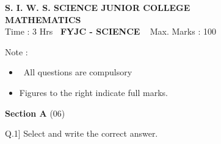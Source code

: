 \documentclass[16pt,a4paper]{article}
\begin{document}
\begin{center}
\textbf {S. I. W. S. SCIENCE JUNIOR COLLEGE } \\
\textbf{MATHEMATICS} \\

Time : 3 Hrs \hspace {3.6cm} \textbf {\ FYJC - SCIENCE}  \hspace{2.9cm} Max. Marks : 100

\end{center}

Note :

\begin {itemize}
\item  All questions are compulsory 
\item Figures to the right indicate full marks.

\end{itemize}


\begin{center}
\hfill \textbf{Section A} \tabto{17.9cm}(06)
\end{center}

\noindent Q.1] Select and write the correct answer.

\end{document}
